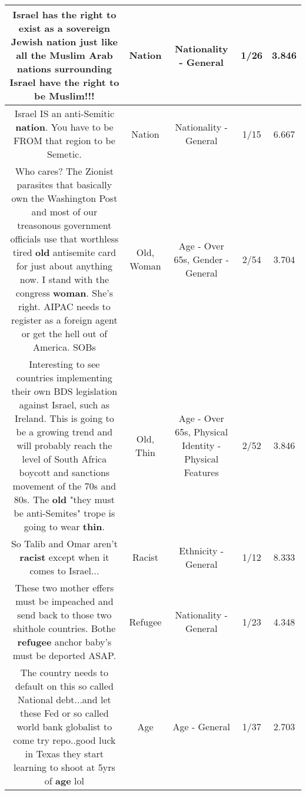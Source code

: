 \documentclass[11pt]{article}
\newlength\mylength
\begin{document}
\begin{center}
\begin{longtable}{|C{.65\mylength}|C{.30\mylength}|C{.12\mylength}|C{.12\mylength}|C{.12\mylength}|}
  \small Israel has the right to exist as a sovereign Jewish \textbf{nation} just like all the Muslim Arab nations surrounding Israel have the right to be Muslim!!!\normalsize   & Nation & Nationality - General & 1/26 & 3.846 \\  \hline
  \small Israel IS an anti-Semitic \textbf{nation}. You have to be FROM that region to be Semetic.\normalsize   & Nation & Nationality - General & 1/15 & 6.667 \\  \hline
  \small Who cares?  The Zionist parasites that basically own the Washington Post and most of our treasonous government officials use that worthless tired \textbf{old} antisemite card for just about anything now.   I stand with the congress \textbf{woman}. She's right.  AIPAC needs to register as a foreign agent or get the hell out of America.  SOBs\normalsize   & Old, Woman & Age - Over 65s, Gender - General & 2/54 & 3.704 \\  \hline
  \small Interesting to see countries implementing their own BDS legislation against Israel, such as Ireland. This is going to be a growing trend and will probably reach the level of South Africa boycott and sanctions movement of the 70s and 80s. The \textbf{old} "they must be anti-Semites" trope is going to wear \textbf{thin}.\normalsize   & Old, Thin & Age - Over 65s, Physical Identity - Physical Features & 2/52 & 3.846 \\  \hline
  \small So Talib and Omar aren't \textbf{racist} except when it comes to Israel...\normalsize   & Racist & Ethnicity - General & 1/12 & 8.333 \\  \hline
  \small These two mother effers must be impeached and send back to those two shithole countries. Bothe \textbf{refugee} anchor baby's must be deported  ASAP.\normalsize   & Refugee & Nationality - General & 1/23 & 4.348 \\  \hline
  \small The country needs to default on this so called National debt...and let these Fed or so called world bank globalist to come try repo..good luck in Texas they start learning to shoot at 5yrs of \textbf{age} lol\normalsize   & Age & Age - General & 1/37 & 2.703 \\  \hline

\end{longtable}
\end{center}
\end{document}
